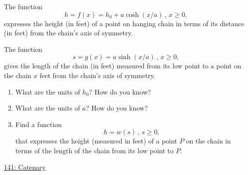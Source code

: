 \documentclass{ximera}
\begin{document}
\begin{question} \label{Qmdfmzmcp023}
The function
\[
    h = f(x) = h_0 + a\cosh(x/a) \, , \, x\geq 0,
\]
expresses the height (in feet) of a point on hanging chain in terms of its distance (in feet) from the chain's axis of symmetry.

The function
\[
      s = g(x) = a\sinh(x/a) \, , \, x\geq 0,
\]
gives the length of the chain (in feet) measured from its low point to a point on the chain $x$ feet from the chain's axis of symmetry.

\begin{enumerate}

\item What are the units of $h_0$? How do you know?

\item What are the units of $a$? How do you know?

\item Find a function
\[
     h = w(s) \, , \, s\geq 0,
\]
that expresses the height (measured in feet) of a point $P$ on the chain in terms of the length of the chain from its low point to $P$.

\end{enumerate}

\begin{onlineOnly}
    \begin{center}
\end{center}
\end{onlineOnly}

\href{https://www.desmos.com/calculator/5oppqdy2l1}{141: Catenary}


\end{question}
\end{document}

